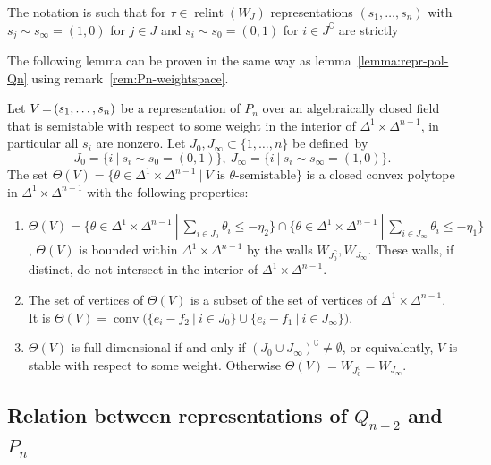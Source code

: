 \documentclass[ALCO,ThmDefs,Unicode,epreuves]{cedram}
\DeclareMathOperator{\conv}{conv}
\DeclareMathOperator{\relint}{relint}
\newcommand*{\Mk}{\mkern -2mu}
\begin{document}
\begin{rema}
The notation is such that for $\tau\in\relint(W_J)$ representations
$(s_1,\ldots,s_n)$ with $s_j\sim s_\infty=(1,0)$ for $j\in J$ and
$s_i\sim s_0=(0,1)$ for $i\in J^\complement$ are strictly %
{}
\end{rema}

The following lemma can be proven in the same way as lemma~\ref{lemma:repr-pol-Qn} 
using remark~\ref{rem:Pn-weightspace}.

\begin{lemma}\label{lemma:repr-pol-Pn}
Let $V\Mk = \Mk (s_1,\ldots,s_n)$ be a representation of $P_n$ over an algebraically closed 
field that is semistable with respect to some weight in the interior of %
$\Delta^1\times\Delta^{n-1}$, in particular all $s_i$ are nonzero.
Let $J_0,J_\infty\subset\{1,\ldots,n\}$ be defined~by 
\[
J_0=\{i\:|\:s_i\sim s_0=(0,1)\},\ J_\infty=\{i\:|\:s_i\sim s_\infty=(1,0)\}.
\] The set 
$\Theta(V)=\{\theta\in\Delta^1\times\Delta^{n-1}\:|\:\text{$V$ is $\theta$-semistable}\}$
is a closed convex polytope in $\Delta^1\times\Delta^{n-1}$ with the following 
properties:
\begin{enumerate}[label=(\alph*)]
\item\label{lemma2.6_1} $\Theta(V)=\{\theta\in\Delta^1\times\Delta^{n-1}\:|\:
\sum_{i\in J_0}\theta_i\leq-\eta_2\}
\cap\{\theta\in\Delta^1\times\Delta^{n-1}\:|\:\sum_{i\in J_\infty}\theta_i\leq-\eta_1\}$,
\ie $\Theta(V)$ is bounded within $\Delta^1\times\Delta^{n-1}$ by the walls 
$W_{\!J_0^\complement},W_{J_\infty}$. These walls, if distinct, do not intersect in 
the interior of $\Delta^1\times\Delta^{n-1}$.
\item\label{lemma2.6_2} The set of vertices of $\Theta(V)$ is a subset of the set of vertices of 
$\Delta^1\times\Delta^{n-1}$. 
It is $\Theta(V)=
\conv\big(\{e_i-f_2\:|\:i\in J_0\}\cup\{e_i-f_1\:|\:i\in J_\infty\}\big)$.
\item\label{lemma2.6_3} $\Theta(V)$ is full dimensional if and only if 
$(J_0\cup J_\infty)^\complement\neq\emptyset$, or equivalently, $V$ 
is stable with respect to some weight. Otherwise 
$\Theta(V)=W_{\!J_0^\complement}=W_{J_\infty}$.
\end{enumerate}
\end{lemma}



\subsection{Relation between representations of \texorpdfstring{$Q_{n+2}$}{Qn+2} and \texorpdfstring{$P_n$}{Pn}}
\label{subsec:Qn+2-Pn}
\end{document}
